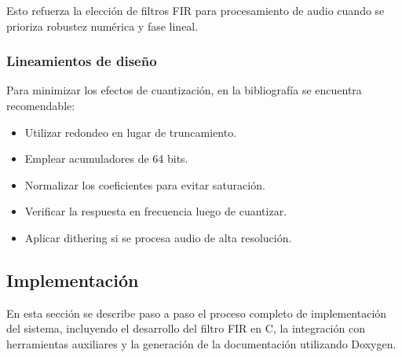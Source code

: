\documentclass[a4,11pt]{article}
\begin{document}
Esto refuerza la elección de filtros FIR para procesamiento de audio cuando se prioriza robustez numérica y fase lineal.

\subsubsection{Lineamientos de diseño}
\label{subsubsec:recomendaciones}

Para minimizar los efectos de cuantización, en la bibliografía \cite{lyons2011} se encuentra recomendable:

\begin{itemize}
\item Utilizar redondeo en lugar de truncamiento.
\item Emplear acumuladores de 64 bits.
\item Normalizar los coeficientes para evitar saturación.
\item Verificar la respuesta en frecuencia luego de cuantizar.
\item Aplicar dithering si se procesa audio de alta resolución.
\end{itemize}


\subsection{Implementación}
\label{sec:implementacion}

En esta sección se describe paso a paso el proceso completo de implementación del sistema, incluyendo el desarrollo del filtro FIR en C, la integración con herramientas auxiliares y la generación de la documentación utilizando Doxygen.
\end{document}
